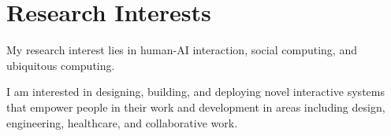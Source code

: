 \section{\textbf{Research Interests}}
\vspace{1mm}
\resumeItemListStart
\item My research interest lies in human-AI interaction, social computing, and ubiquitous computing. 
\item I am interested in designing, building, and deploying novel interactive systems that empower people in their work and development in areas including design, engineering, healthcare, and collaborative work.

\resumeItemListEnd
\vspace{-3mm}